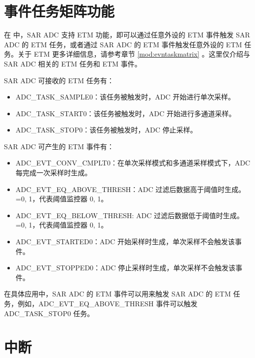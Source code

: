 \documentclass[main\_\_CN.tex]{subfiles}
\begin{document}

\section{事件任务矩阵功能}
\label{sec:adc-etm-func}

在 \chipname{} 中，SAR ADC 支持 ETM 功能，即可以通过任意外设的 ETM 事件触发 SAR ADC 的 ETM 任务，或者通过 SAR ADC 的 ETM 事件触发任意外设的 ETM 任务。关于 ETM 更多详细信息，请参考章节 \ref{mod:evntaskmatrix} 。这里仅介绍与 SAR ADC 相关的 ETM 任务和 ETM 事件。

SAR ADC 可接收的 ETM 任务有：

\begin{itemize}
    \item ADC\_TASK\_SAMPLE0：该任务被触发时，ADC 开始进行单次采样。
    \item ADC\_TASK\_START0：该任务被触发时，ADC 开始进行多通道采样。
    \item ADC\_TASK\_STOP0：该任务被触发时，ADC 停止采样。
\end{itemize}

SAR ADC 可产生的 ETM 事件有：

\begin{itemize}
    \item ADC\_EVT\_CONV\_CMPLT0：在单次采样模式和多通道采样模式下，ADC 每完成一次采样时生成。
    \item ADC\_EVT\_EQ\_ABOVE\_THRESH：ADC 过滤后数据高于阈值时生成。=0, 1，代表阈值监控器 0, 1。
    \item ADC\_EVT\_EQ\_BELOW\_THRESH: ADC 过滤后数据低于阈值时生成。=0, 1，代表阈值监控器 0, 1。
    \item ADC\_EVT\_STARTED0：ADC 开始采样时生成，单次采样不会触发该事件。
    \item ADC\_EVT\_STOPPED0：ADC 停止采样时生成，单次采样不会触发该事件。
\end{itemize}

在具体应用中，SAR ADC 的 ETM 事件可以用来触发 SAR ADC 的 ETM 任务，例如，ADC\_EVT\_EQ\_ABOVE\_THRESH 事件可以触发 ADC\_TASK\_STOP0 任务。



\section{中断}
\label{sec:adc_interrupts}
\end{document}
